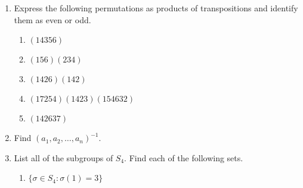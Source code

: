 {\begin{enumerate}
\begin{multicols}{2}
\begin{enumerate}
\item
$(1254)^{-1} (123)(45) (1254)$
  
\item
$(1254)^2 (123)(45)$
 
\item
$(123)(45) (1254)^{-2}$

\item
$(1254)^{100}$
 
\item
$|(1254)|$

  
\item
$|(1254)^2|$
  
\item
$(12)^{-1}$

\item
$(12537)^{-1}$
 
\item
$[(12)(34)(12)(47)]^{-1}$

\item
$[(1235)(467)]^{-1}$
 
\end{enumerate}
\end{multicols}
 
 
 \item %
Express the following permutations as products of transpositions and
identify them as even or odd. 
\begin{multicols}{2}
\begin{enumerate}
 
\item
$(14356)$

 \item
$(156)(234)$
 
 \item
$(1426)(142)$
 
 \item
$(17254)(1423)(154632)$
 
 \item
$(142637)$
 
\end{enumerate}
\end{multicols}


 
\item %
Find $(a_1, a_2, \ldots, a_n)^{-1}$.
 
\item %
List all of the subgroups of $S_4$. Find each of the following sets. 
\begin{enumerate}
 
 \item
$\{ \sigma \in S_4 : \sigma(1) = 3 \}$
 

\end{enumerate}
\end{enumerate}}
